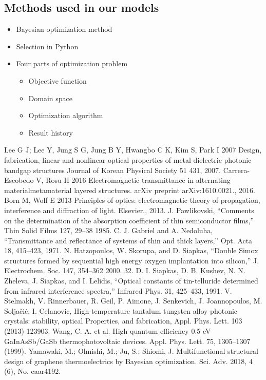\documentclass{apmcmthesis}
\begin{document}
\subsection{Methods used in our models}
\begin{itemize}
\item Bayesian optimization method
\item Selection in Python
\item Four parts of optimization problem
\begin{itemize}
\item Objective function
\item Domain space
\item Optimization algorithm
\item Result history
\end{itemize}
\end{itemize}

\newpage
\begin{thebibliography}{9}%
 Lee G J; Lee Y, Jung S G, Jung B Y, Hwangbo C K, Kim S, Park I 2007 Design, fabrication, linear and nonlinear optical properties of metal-dielectric photonic bandgap structures Journal of Korean Physical Society 51 431, 2007.
 Carrera-Escobedo V, Rosu H 2016 Electromagnetic transmittance in alternating materialmetamaterial layered structures. arXiv preprint arXiv:1610.0021., 2016.
 Born M, Wolf E 2013 Principles of optics: electromagnetic theory of propagation, interference and diffraction of light. Elsevier., 2013.
 J. Pawlikovski, “Comments on the determination of the absorption coefficient of thin semiconductor films,” Thin Solid Films 127, 29–38 1985.
 C. J. Gabriel and A. Nedoluha, “Transmittance and reflectance of systems of thin and thick layers,” Opt. Acta 18, 415–423, 1971.
 N. Hatzopoulos, W. Skorupa, and D. Siapkas, “Double Simox structures formed by sequential high energy oxygen implantation into silicon,” J. Electrochem. Soc. 147, 354–362 2000. 32. D. I. Siapkas, D. B. Kushev, N. N. Zheleva, J. Siapkas, and I. Lelidis, “Optical constants of tin-telluride determined from infrared interference spectra,” Infrared Phys. 31, 425–433, 1991.
 V. Stelmakh, V. Rinnerbauer, R. Geil, P. Aimone, J. Senkevich, J. Joannopoulos, M. Soljačić, I. Celanovic, High-temperature tantalum tungsten alloy photonic crystals: stability, optical Properties, and fabrication, Appl. Phys. Lett. 103 (2013) 123903.
 Wang, C. A. et al. High-quantum-efficiency 0.5 eV GaInAsSb/GaSb thermophotovoltaic devices. Appl. Phys. Lett. 75, 1305–1307 (1999).
 Yamawaki, M.; Ohnishi, M.; Ju, S.; Shiomi, J. Multifunctional structural design of graphene thermoelectrics by Bayesian optimization. Sci. Adv. 2018, 4 (6), No. eaar4192.
\end{thebibliography}
\end{document}
